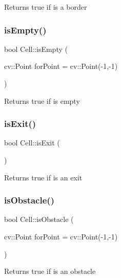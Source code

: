 \begin{DoxyReturn}{Returns}
true if is a border 
\end{DoxyReturn}
\mbox{\label{class_cell_a5175d1bb16d2192ecfcb6e7c0a962389}} 
\subsubsection{\texorpdfstring{is\+Empty()}{isEmpty()}}
{\footnotesize\ttfamily bool Cell\+::is\+Empty (\begin{DoxyParamCaption}\item[{cv\+::\+Point}]{for\+Point = {\ttfamily cv\+:\+:Point(-\/1,-\/1)} }\end{DoxyParamCaption})}

\begin{DoxyReturn}{Returns}
true if is empty 
\end{DoxyReturn}
\mbox{\label{class_cell_aaf13f5d308c7f1eb670a050e4fc6dc28}} 
\subsubsection{\texorpdfstring{is\+Exit()}{isExit()}}
{\footnotesize\ttfamily bool Cell\+::is\+Exit (\begin{DoxyParamCaption}{ }\end{DoxyParamCaption})}

\begin{DoxyReturn}{Returns}
true if is an exit 
\end{DoxyReturn}
\mbox{\label{class_cell_a8c505bb81ec2fbbb68ffb3d022c43b10}} 
\subsubsection{\texorpdfstring{is\+Obstacle()}{isObstacle()}}
{\footnotesize\ttfamily bool Cell\+::is\+Obstacle (\begin{DoxyParamCaption}\item[{cv\+::\+Point}]{for\+Point = {\ttfamily cv\+:\+:Point(-\/1,-\/1)} }\end{DoxyParamCaption})}

\begin{DoxyReturn}{Returns}
true if is an obstacle 
\end{DoxyReturn}
\mbox{\label{class_cell_ad86a719c04ff04bdf79c1c0b8e5a5942}} 
